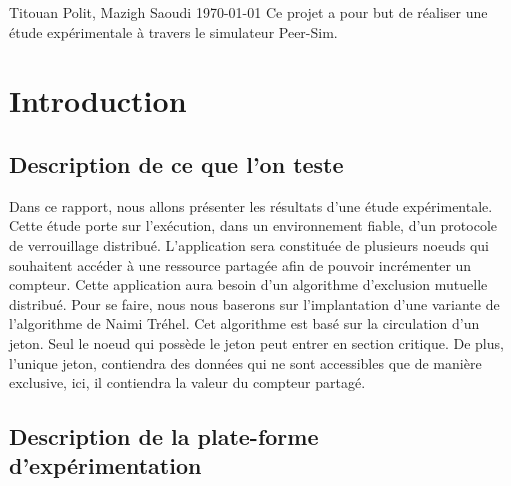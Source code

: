 \documentclass[12pt,a4paper]{article}
\begin{document}
{}
{Titouan Polit, Mazigh Saoudi}
{}
{\today}
{Ce projet a pour but de réaliser une étude expérimentale à travers le simulateur Peer-Sim.}



\author{Titouan Polit, Mazigh Saoudi}



% 


\tableofcontents
\vspace*{-0.5cm}

\newpage



\section{Introduction}

\subsection{Description de ce que l'on teste}

Dans ce rapport, nous allons présenter les résultats d'une étude expérimentale. Cette étude porte sur l'exécution, dans un environnement fiable, d'un protocole de verrouillage distribué. L'application sera constituée de plusieurs noeuds qui souhaitent accéder à une ressource partagée afin de pouvoir incrémenter un compteur. Cette application aura besoin d'un algorithme d'exclusion mutuelle distribué. Pour se faire, nous nous baserons sur l'implantation d'une variante de l'algorithme de Naimi Tréhel. Cet algorithme est basé sur la circulation d'un jeton. Seul le noeud qui possède le jeton peut entrer en section critique. De plus, l'unique jeton, contiendra des données qui ne sont accessibles que de manière exclusive, ici, il contiendra la valeur du compteur partagé.

\subsection{Description de la plate-forme d'expérimentation}
\end{document}
